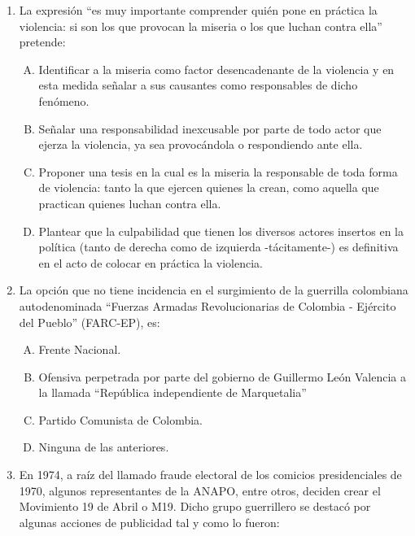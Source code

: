 \begin{enumerate}

\item  La expresión ``es muy importante comprender quién pone en práctica la violencia: si son los que provocan la miseria o los que luchan contra ella'' pretende:\label{sociii-8}


\begin{enumerate}[(A)]
\item   Identificar a la miseria como factor desencadenante de la violencia y en esta medida señalar a sus causantes como responsables de dicho fenómeno.
 \item  Señalar una responsabilidad inexcusable por parte de todo actor que ejerza la violencia, ya sea provocándola o respondiendo ante ella.
\item Proponer una  tesis en la cual es la miseria la responsable de toda forma de violencia: tanto la que ejercen quienes la crean, como aquella que practican quienes luchan contra ella.
\item Plantear que la culpabilidad que tienen los diversos actores insertos en la política (tanto de derecha como de izquierda -tácitamente-) es definitiva en el acto de colocar en práctica la violencia.  
\end{enumerate}



\item La opción que no tiene incidencia en el surgimiento de la guerrilla colombiana autodenominada ``Fuerzas Armadas Revolucionarias de Colombia - Ejército del Pueblo'' (FARC-EP), es:\label{sociii-9}


\begin{enumerate}[(A)]
\item   Frente Nacional.
 \item  Ofensiva perpetrada por parte del gobierno de Guillermo León Valencia a la llamada ``República independiente de Marquetalia''
\item Partido Comunista de Colombia.
\item Ninguna de las anteriores.
\end{enumerate}



\item En 1974, a raíz del llamado fraude electoral de los comicios presidenciales de 1970, algunos representantes de la ANAPO, entre otros, deciden crear el Movimiento 19 de Abril o M19. Dicho grupo guerrillero se destacó por algunas acciones de publicidad tal y como lo fueron:\label{sociii-10}



\end{enumerate}

